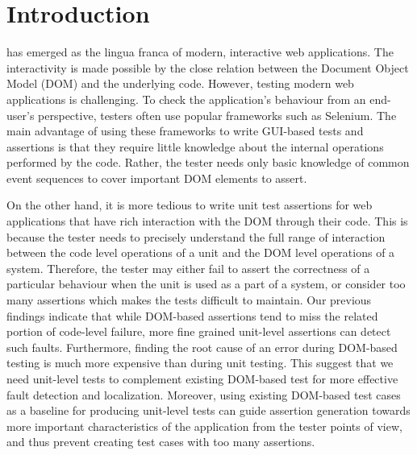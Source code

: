 \section{Introduction} \label{Sec:intro}

\javascript has emerged as the lingua franca of modern, interactive web applications. 
The interactivity is made possible by the close relation between the Document Object Model (DOM) and the underlying \javascript code.
However, testing modern web applications is challenging.  
To check the application's behaviour from an end-user's perspective, testers often use popular frameworks such as Selenium. 
The main advantage of using these frameworks to write GUI-based tests and assertions is that they require little knowledge about the internal operations performed by the code. 
Rather, the tester needs only basic knowledge of common event sequences to cover important DOM elements to assert. 

 
On the other hand, it is more tedious to
write unit test assertions for web applications that have rich interaction with the DOM through their \javascript code. 
This is because the tester needs to precisely understand the full range of interaction between the code level operations of a unit and the DOM level operations of a system. Therefore, the tester may either fail to assert the correctness of a particular behaviour when the unit is used as a part of a system, or consider too many assertions which makes the tests difficult to maintain. 
Our previous findings \cite{mirshokraie:icst15} indicate that while DOM-based assertions tend to miss the related portion of
code-level failure, more fine grained unit-level assertions can detect such faults. 
Furthermore, finding the root cause of an error during DOM-based testing is much more expensive than during unit testing.
This suggest that we need unit-level tests to complement existing DOM-based test for more effective fault detection and localization. Moreover, using existing DOM-based test cases as a baseline for producing unit-level tests can guide assertion generation towards more important characteristics of the application from the tester points of view, and thus prevent creating test cases with too many assertions.    

